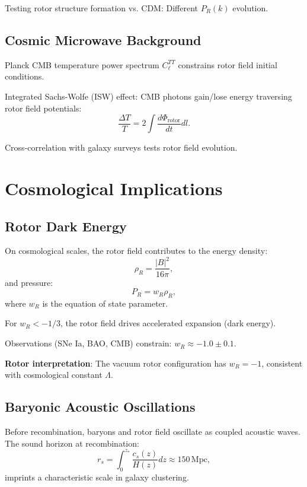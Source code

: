 \documentclass[12pt,a4paper]{article}
\theoremstyle{definition}
\theoremstyle{remark}
\begin{document}
Testing rotor structure formation vs. CDM: Different $P_R(k)$ evolution.

\subsection{Cosmic Microwave Background}

Planck CMB temperature power spectrum $C_\ell^{TT}$ constrains rotor field initial conditions.

Integrated Sachs-Wolfe (ISW) effect: CMB photons gain/lose energy traversing rotor field potentials:
\begin{equation}
\frac{\Delta T}{T} = 2 \int \frac{d\Phi_{\text{rotor}}}{dt} dl.
\end{equation}

Cross-correlation with galaxy surveys tests rotor field evolution.

\section{Cosmological Implications}

\subsection{Rotor Dark Energy}

On cosmological scales, the rotor field contributes to the energy density:
\begin{equation}
\rho_R = \frac{|B|^2}{16\pi},
\end{equation}
and pressure:
\begin{equation}
P_R = w_R \rho_R,
\end{equation}
where $w_R$ is the equation of state parameter.

For $w_R < -1/3$, the rotor field drives accelerated expansion (dark energy).

Observations (SNe Ia, BAO, CMB) constrain: $w_R \approx -1.0 \pm 0.1$.

\textbf{Rotor interpretation}: The vacuum rotor configuration has $w_R = -1$, consistent with cosmological constant $\Lambda$.

\subsection{Baryonic Acoustic Oscillations}

Before recombination, baryons and rotor field oscillate as coupled acoustic waves. The sound horizon at recombination:
\begin{equation}
r_s = \int_0^{z_*} \frac{c_s(z)}{H(z)} dz \approx 150 \, \text{Mpc},
\end{equation}
imprints a characteristic scale in galaxy clustering.
\end{document}
